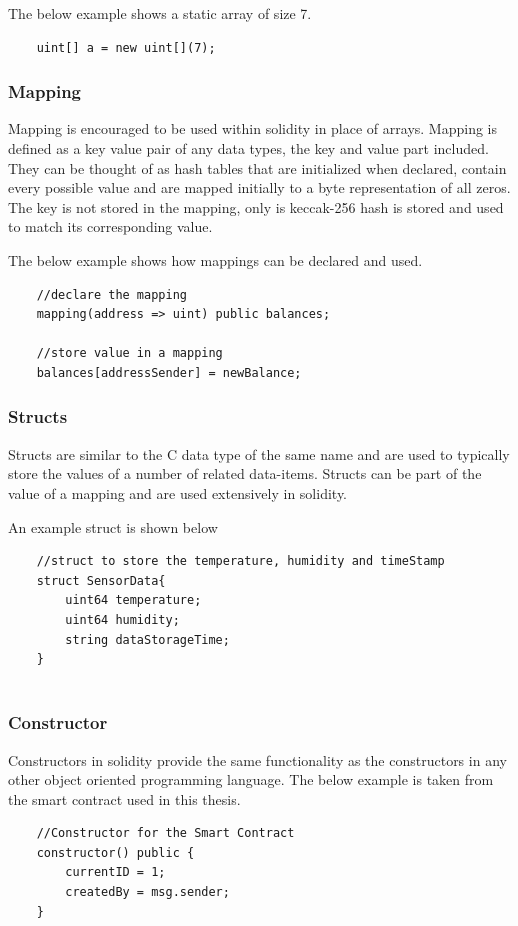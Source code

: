 \documentclass[11pt,openright]{report}
\begin{document}
The below example shows a static array of size 7.
\begin{verbatim}
    uint[] a = new uint[](7);
\end{verbatim}

\subsubsection{Mapping}
Mapping is encouraged to be used within solidity in place of arrays. Mapping is defined as a key value pair of any data types, the key and value part included. They can be thought of as hash tables that are initialized when declared, contain every possible value and are mapped initially to a byte representation of all zeros. The key is not stored in the mapping, only is keccak-256 hash is stored and used to match its corresponding value.

The below example shows how mappings can be declared and used.
\begin{verbatim}
    //declare the mapping
    mapping(address => uint) public balances;
    
    //store value in a mapping
    balances[addressSender] = newBalance;
\end{verbatim}

\subsubsection{Structs}
Structs are similar to the C data type of the same name and are used to typically store the values of a number of related data-items. Structs can be part of the value of a mapping and are used extensively in solidity.

An example struct is shown below
\begin{verbatim}
    //struct to store the temperature, humidity and timeStamp
    struct SensorData{
        uint64 temperature;
        uint64 humidity;
        string dataStorageTime;
    }
    
\end{verbatim}

\subsubsection{Constructor}
Constructors in solidity provide the same functionality as the constructors in any other object oriented programming language. The below example is taken from the smart contract used in this thesis.
\begin{verbatim}
    //Constructor for the Smart Contract
    constructor() public {
        currentID = 1;
        createdBy = msg.sender;
    }
\end{verbatim}
\end{document}
